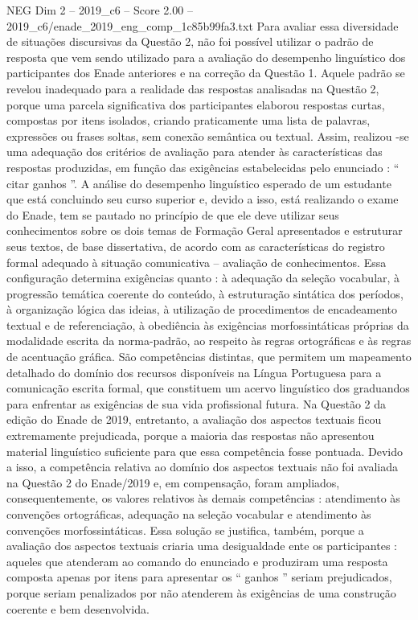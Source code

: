 \begin{textsample}{NEG Dim 2 – 2019\_c6 – Score 2.00 – 2019\_c6/enade\_2019\_eng\_comp\_1c85b99fa3.txt}
Para avaliar essa diversidade de situações discursivas da Questão 2, não foi possível utilizar o padrão de resposta que vem sendo utilizado para a avaliação do desempenho linguístico dos participantes dos Enade anteriores e na correção da Questão 1.
Aquele padrão se revelou inadequado para a realidade das respostas analisadas na Questão 2, porque uma parcela significativa dos participantes elaborou respostas curtas, compostas por itens isolados, criando praticamente uma lista de palavras, expressões ou frases soltas, sem conexão semântica ou textual.
Assim, realizou -se uma adequação dos critérios de avaliação para atender às características das respostas produzidas, em função das exigências estabelecidas pelo enunciado : “ citar ganhos ”.
A análise do desempenho linguístico esperado de um estudante que está concluindo seu curso superior e, devido a isso, está realizando o exame do Enade, tem se pautado no princípio de que ele deve utilizar seus conhecimentos sobre os dois temas de Formação Geral apresentados e estruturar seus textos, de base dissertativa, de acordo com as características do registro formal adequado à situação comunicativa – avaliação de conhecimentos.
Essa configuração determina exigências quanto : à adequação da seleção vocabular, à progressão temática coerente do conteúdo, à estruturação sintática dos períodos, à organização lógica das ideias, à utilização de procedimentos de encadeamento textual e de referenciação, à obediência às exigências morfossintáticas próprias da modalidade escrita da norma-padrão, ao respeito às regras ortográficas e às regras de acentuação gráfica.
São competências distintas, que permitem um mapeamento detalhado do domínio dos recursos disponíveis na Língua Portuguesa para a comunicação escrita formal, que constituem um acervo linguístico dos graduandos para enfrentar as exigências de sua vida profissional futura.
Na Questão 2 da edição do Enade de 2019, entretanto, a avaliação dos aspectos textuais ficou extremamente prejudicada, porque a maioria das respostas não apresentou material linguístico suficiente para que essa competência fosse pontuada.
Devido a isso, a competência relativa ao domínio dos aspectos textuais não foi avaliada na Questão 2 do Enade/2019 e, em compensação, foram ampliados, consequentemente, os valores relativos às demais competências : atendimento às convenções ortográficas, adequação na seleção vocabular e atendimento às convenções morfossintáticas.
Essa solução se justifica, também, porque a avaliação dos aspectos textuais criaria uma desigualdade ente os participantes : aqueles que atenderam ao comando do enunciado e produziram uma resposta composta apenas por itens para apresentar os “ ganhos ” seriam prejudicados, porque seriam penalizados por não atenderem às exigências de uma construção coerente e bem desenvolvida.

\end{textsample}
